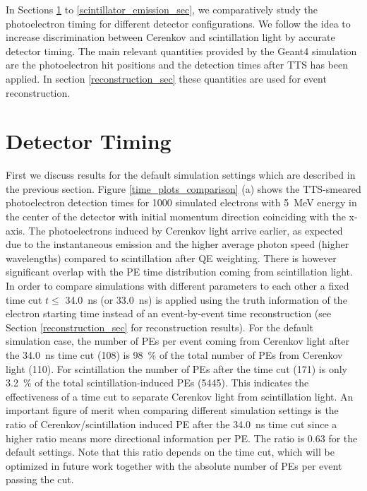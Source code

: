 \documentclass[aps,prc,twocolumn,groupedaddress,showpacs,amsmath,amssymb,floatfix,superscriptaddress]{revtex4}
\begin{document}
In Sections \ref{detector_timing_sec} to \ref{scintillator_emission_sec}, we comparatively study the photoelectron timing for different detector configurations. We follow the idea to increase discrimination between Cerenkov and scintillation light by accurate detector timing. The main relevant quantities provided by the Geant4 simulation are the photoelectron hit positions and the detection times after TTS has been applied. In section \ref{reconstruction_sec} these quantities are used for event reconstruction.

\section{Detector Timing}
\label{detector_timing_sec}

First we discuss results for the default simulation settings which are described in the previous section. Figure \ref{time_plots_comparison} (a) shows the TTS-smeared photoelectron detection times for 1000 simulated electrons with 5~MeV energy in the center of the detector with initial momentum direction coinciding with the x-axis. The photoelectrons induced by Cerenkov light arrive earlier, as expected due to the instantaneous emission and the higher average photon speed (higher wavelengths) compared to scintillation after QE weighting. There is however significant overlap with the PE time distribution coming from scintillation light. In order to compare simulations with different parameters to each other a fixed time cut $t \leq$ 34.0~ns (or 33.0~ns) is applied using the truth information of the electron starting time instead of an event-by-event time reconstruction (see Section \ref{reconstruction_sec} for reconstruction results). For the default simulation case, the number of PEs per event coming from Cerenkov light after the 34.0~ns time cut (108) is 98~\% of the total number of PEs from Cerenkov light (110). For scintillation the number of PEs after the time cut (171) is only 3.2~\% of the total scintillation-induced PEs (5445). This indicates the effectiveness of a time cut to separate Cerenkov light from scintillation light. An important figure of merit when comparing different simulation settings is the ratio of Cerenkov/scintillation induced PE after the 34.0~ns time cut since a higher ratio means more directional information per PE. The ratio is 0.63 for the default settings. Note that this ratio depends on the time cut, which will be optimized in future work together with the absolute number of PEs per event passing the cut. 
\end{document}
